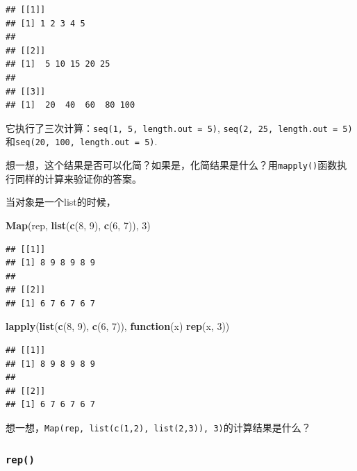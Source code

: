 \documentclass[]{book}
\newenvironment{Shaded}{\begin{snugshade}}{\end{snugshade}}
\newcommand{\ControlFlowTok}[1]{\textcolor[rgb]{0.13,0.29,0.53}{\textbf{#1}}}
\newcommand{\DecValTok}[1]{\textcolor[rgb]{0.00,0.00,0.81}{#1}}
\newcommand{\KeywordTok}[1]{\textcolor[rgb]{0.13,0.29,0.53}{\textbf{#1}}}
\newcommand{\NormalTok}[1]{#1}
\begin{document}
\begin{verbatim}
## [[1]]
## [1] 1 2 3 4 5
## 
## [[2]]
## [1]  5 10 15 20 25
## 
## [[3]]
## [1]  20  40  60  80 100
\end{verbatim}

它执行了三次计算：\texttt{seq(1,\ 5,\ length.out\ =\ 5)}, \texttt{seq(2,\ 25,\ length.out\ =\ 5)}和\texttt{seq(20,\ 100,\ length.out\ =\ 5)}.

想一想，这个结果是否可以化简？如果是，化简结果是什么？用\texttt{mapply()}函数执行同样的计算来验证你的答案。

当对象是一个list的时候，

\begin{Shaded}
\begin{Highlighting}[]
\KeywordTok{Map}\NormalTok{(rep, }\KeywordTok{list}\NormalTok{(}\KeywordTok{c}\NormalTok{(}\DecValTok{8}\NormalTok{, }\DecValTok{9}\NormalTok{), }\KeywordTok{c}\NormalTok{(}\DecValTok{6}\NormalTok{, }\DecValTok{7}\NormalTok{)), }\DecValTok{3}\NormalTok{)}
\end{Highlighting}
\end{Shaded}

\begin{verbatim}
## [[1]]
## [1] 8 9 8 9 8 9
## 
## [[2]]
## [1] 6 7 6 7 6 7
\end{verbatim}

\begin{Shaded}
\begin{Highlighting}[]
\KeywordTok{lapply}\NormalTok{(}\KeywordTok{list}\NormalTok{(}\KeywordTok{c}\NormalTok{(}\DecValTok{8}\NormalTok{, }\DecValTok{9}\NormalTok{), }\KeywordTok{c}\NormalTok{(}\DecValTok{6}\NormalTok{, }\DecValTok{7}\NormalTok{)), }\ControlFlowTok{function}\NormalTok{(x) }\KeywordTok{rep}\NormalTok{(x, }\DecValTok{3}\NormalTok{))}
\end{Highlighting}
\end{Shaded}

\begin{verbatim}
## [[1]]
## [1] 8 9 8 9 8 9
## 
## [[2]]
## [1] 6 7 6 7 6 7
\end{verbatim}

想一想，\texttt{Map(rep,\ list(c(1,2),\ list(2,3)),\ 3)}的计算结果是什么？

\hypertarget{rep-1}{%
\subsubsection{\texorpdfstring{\texttt{rep()}}{rep()}}\label{rep-1}}
\end{document}

